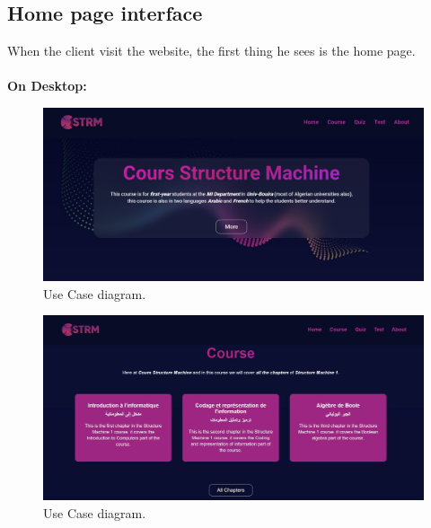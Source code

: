 \subsection{Home page interface}
When the client visit the website, the first thing he sees is the home page.\\\\
\textbf{On Desktop:}
\begin{figure}[ht]
	\centering
	\label{}\includegraphics[scale=0.5]{img/0.jpg}                
	\caption{Use Case diagram.} 
	\label{fig:UseCaseD}
\end{figure} 


\begin{figure}[ht]
	\centering
	\label{}\includegraphics[scale=0.5]{img/1.jpg}                
	\caption{Use Case diagram.} 
	\label{fig:UseCaseD}
\end{figure} 

